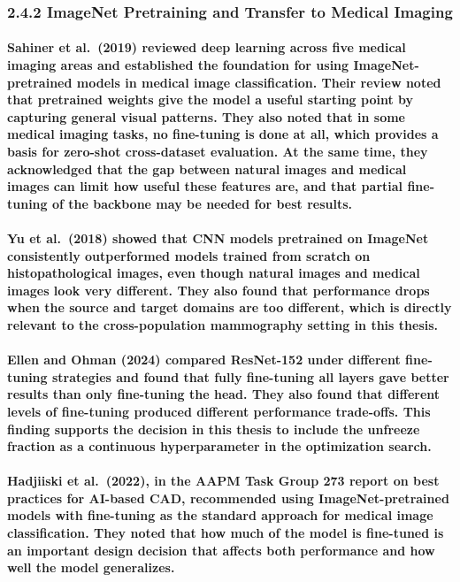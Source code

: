 \subsubsection{2.4.2 ImageNet Pretraining and Transfer to Medical
Imaging}\label{imagenet-pretraining-and-transfer-to-medical-imaging}

\paragraph{Sahiner et al. (2019) reviewed deep learning across five medical imaging areas and established the foundation for using ImageNet-pretrained models in medical image classification. Their review noted that pretrained weights give the model a useful starting point by capturing general visual patterns. They also noted that in some medical imaging tasks, no fine-tuning is done at all, which provides a basis for zero-shot cross-dataset evaluation. At the same time, they acknowledged that the gap between natural images and medical images can limit how useful these features are, and that partial fine-tuning of the backbone may be needed for best results.}

\paragraph{Yu et al. (2018) showed that CNN models pretrained on ImageNet consistently outperformed models trained from scratch on histopathological images, even though natural images and medical images look very different. They also found that performance drops when the source and target domains are too different, which is directly relevant to the cross-population mammography setting in this thesis.}

\paragraph{Ellen and Ohman (2024) compared ResNet-152 under different fine-tuning strategies and found that fully fine-tuning all layers gave better results than only fine-tuning the head. They also found that different levels of fine-tuning produced different performance trade-offs. This finding supports the decision in this thesis to include the unfreeze fraction as a continuous hyperparameter in the optimization search.}

\paragraph{Hadjiiski et al. (2022), in the AAPM Task Group 273 report on best practices for AI-based CAD, recommended using ImageNet-pretrained models with fine-tuning as the standard approach for medical image classification. They noted that how much of the model is fine-tuned is an important design decision that affects both performance and how well the model generalizes.}

